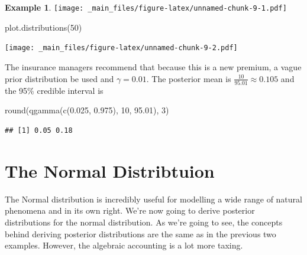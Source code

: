 \documentclass[
]{book}
\newenvironment{Shaded}{\begin{snugshade}}{\end{snugshade}}
\newcommand{\DecValTok}[1]{\textcolor[rgb]{0.00,0.00,0.81}{#1}}
\newcommand{\FloatTok}[1]{\textcolor[rgb]{0.00,0.00,0.81}{#1}}
\newcommand{\FunctionTok}[1]{\textcolor[rgb]{0.00,0.00,0.00}{#1}}
\newcommand{\NormalTok}[1]{#1}
\theoremstyle{definition}
\theoremstyle{definition}
\newtheorem{example}{Example}[chapter]
\theoremstyle{definition}
\theoremstyle{definition}
\theoremstyle{remark}
\begin{document}
\begin{example}
\texttt{[image: \_main\_files/figure-latex/unnamed-chunk-9-1.pdf]}

\begin{Shaded}
\begin{Highlighting}[]
\FunctionTok{plot.distributions}\NormalTok{(}\DecValTok{50}\NormalTok{)}
\end{Highlighting}
\end{Shaded}

\texttt{[image: \_main\_files/figure-latex/unnamed-chunk-9-2.pdf]}

The insurance managers recommend that because this is a new premium, a vague prior distribution be used and \(\gamma = 0.01\). The posterior mean is \(\frac{10}{95.01} \approx 0.105\) and the 95\% credible interval is

\begin{Shaded}
\begin{Highlighting}[]
\FunctionTok{round}\NormalTok{(}\FunctionTok{qgamma}\NormalTok{(}\FunctionTok{c}\NormalTok{(}\FloatTok{0.025}\NormalTok{, }\FloatTok{0.975}\NormalTok{), }\DecValTok{10}\NormalTok{, }\FloatTok{95.01}\NormalTok{), }\DecValTok{3}\NormalTok{)}
\end{Highlighting}
\end{Shaded}

\begin{verbatim}
## [1] 0.05 0.18
\end{verbatim}

\end{example}

\hypertarget{the-normal-distribtuion}{%
\section{The Normal Distribtuion}\label{the-normal-distribtuion}}

The Normal distribution is incredibly useful for modelling a wide range of natural phenomena and in its own right. We're now going to derive posterior distributions for the normal distribution. As we're going to see, the concepts behind deriving posterior distributions are the same as in the previous two examples. However, the algebraic accounting is a lot more taxing.
\end{document}
